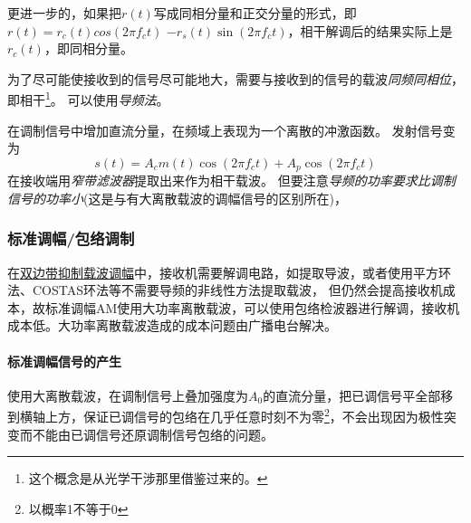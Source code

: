     更进一步的，如果把$r(t)$写成同相分量和正交分量的形式，即$r(t)=r_c(t)cos(2\pi f_ct)$ $-r_s(t)\sin(2\pi f_ct)$，相干解调后的结果实际上是$r_c(t)$，即同相分量。

    为了尽可能使接收到的信号尽可能地大，需要与接收到的信号的载波\emph{同频同相位}，即相干\footnote{这个概念是从光学干涉那里借鉴过来的。}。
    可以使用\emph{导频法}。

    在调制信号中增加直流分量，在频域上表现为一个离散的冲激函数。
    发射信号变为
    \begin{equation}
        s(t)=A_cm(t)\cos(2\pi f_ct)+A_p\cos(2\pi f_ct)
    \end{equation}
    在接收端用\emph{窄带滤波器}提取出来作为相干载波。
    但要注意\emph{导频的功率要求比调制信号的功率小}(这是与有大离散载波的调幅信号的区别所在)，

    \subsubsection[标准调幅]{标准调幅/包络调制}\label{subsubsec:AM}
    在\hyperref[subsubsec:DSB-SCAM]{双边带抑制载波调幅}中，接收机需要解调电路，如提取导波，或者使用平方环法、COSTAS环法等不需要导频的非线性方法提取载波，
    但仍然会提高接收机成本，故标准调幅AM使用大功率离散载波，可以使用包络检波器进行解调，接收机成本低。大功率离散载波造成的成本问题由广播电台解决。
    
    \paragraph{标准调幅信号的产生}\mbox{}

    使用大离散载波，在调制信号上叠加强度为$A_0$的直流分量，把已调信号平全部移到横轴上方，保证已调信号的包络在几乎任意时刻不为零\footnote{以概率1不等于0}，不会出现因为极性突变而不能由已调信号还原调制信号包络的问题。

